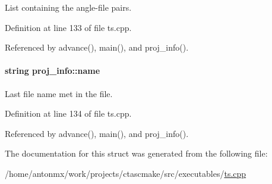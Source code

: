 List containing the angle-\/file pairs. 



Definition at line 133 of file ts.cpp.



Referenced by advance(), main(), and proj\_\-info().

\hypertarget{structproj__info_aefed04f549ab983feab9e6fe7cd224ca}{
\paragraph[{name}]{\setlength{\rightskip}{0pt plus 5cm}string {\bf proj\_\-info::name}}\hfill}
\label{structproj__info_aefed04f549ab983feab9e6fe7cd224ca}


Last file name met in the file. 



Definition at line 134 of file ts.cpp.



Referenced by advance(), main(), and proj\_\-info().



The documentation for this struct was generated from the following file:\begin{DoxyCompactItemize}
\item 
/home/antonmx/work/projects/ctascmake/src/executables/\hyperlink{ts_8cpp}{ts.cpp}\end{DoxyCompactItemize}
